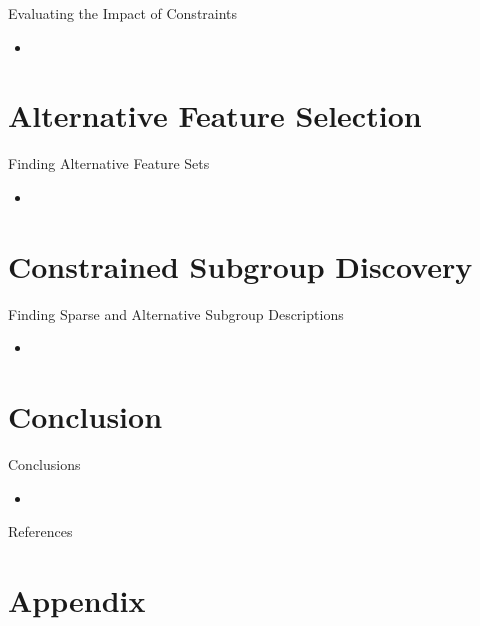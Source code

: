 \documentclass[en, navbarinline, handout]{sdqbeamer}
\begin{document}
\begin{frame}[t]{Evaluating the Impact of Constraints}
	\begin{itemize}
		\item
	\end{itemize}
\end{frame}

\section{Alternative Feature Selection}

\begin{frame}[t]{Finding Alternative Feature Sets}
	\begin{itemize}
		\item
	\end{itemize}
\end{frame}

\section{Constrained Subgroup Discovery}

\begin{frame}[t]{Finding Sparse and Alternative Subgroup Descriptions}
	\begin{itemize}
		\item
	\end{itemize}
\end{frame}

\section{Conclusion}

\begin{frame}[t]{Conclusions}
	\begin{itemize}
		\item
	\end{itemize}
\end{frame}

\appendix
\beginbackup %

\begin{frame}[t, allowframebreaks]{References}
	\printbibliography
\end{frame}

\section{Appendix}
\end{document}
